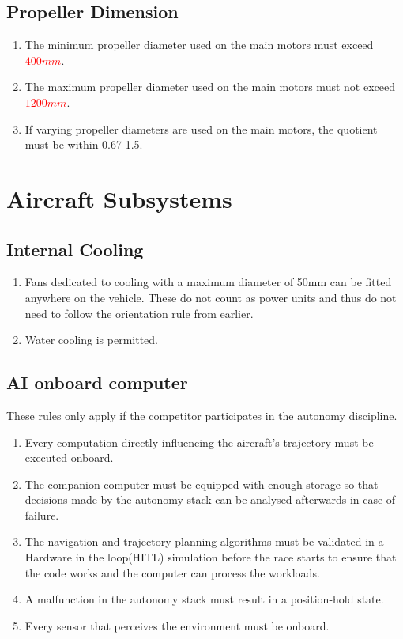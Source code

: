 \documentclass{article}
\begin{document}
\subsection{Propeller Dimension}
\begin{enumerate}
  \item The minimum propeller diameter used on the main motors must exceed \textcolor{red}{$400mm$}.
  \item The maximum propeller diameter used on the main motors must not exceed \textcolor{red}{$1200mm$}.
  \item If varying propeller diameters are used on the main motors, the quotient must be within 0.67-1.5.
\end{enumerate}





\section{Aircraft Subsystems}

\subsection{Internal Cooling}
\begin{enumerate}
  \item Fans dedicated to cooling with a maximum diameter of 50mm can be fitted anywhere on the vehicle. These do not count as power units and thus do not need to follow the orientation rule from earlier.
  \item Water cooling is permitted. 
\end{enumerate}

\subsection{AI onboard computer}
These rules only apply if the competitor participates in the autonomy discipline.
\begin{enumerate}
  \item Every computation directly influencing the aircraft's trajectory must be executed onboard.
  \item The companion computer must be equipped with enough storage so that decisions made by the autonomy stack can be analysed afterwards in case of failure. 
  \item The navigation and trajectory planning algorithms must be validated in a Hardware in the loop(HITL) simulation before the race starts to ensure that the code works and the computer can process the workloads.
  \item A malfunction in the autonomy stack must result in a position-hold state. 
  \item Every sensor that perceives the environment must be onboard.
\end{enumerate}
\end{document}
